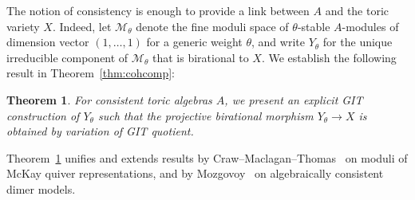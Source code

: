 \documentclass[11pt,a4paper]{amsart}
\numberwithin{equation}{section}
\newtheorem{theorem}{Theorem}[section]
\theoremstyle{definition}
\theoremstyle{remark}
\begin{document}
The notion of consistency is enough to provide a link between $A$ and the toric variety $X$. Indeed, let $\mathcal{M}_{\theta}$ denote the fine moduli space of $\theta$-stable $A$-modules of dimension vector $(1,\dots,1)$ for a generic weight $\theta$, and write $Y_\theta$ for the unique irreducible component of $\mathcal{M}_\theta$ that is birational to $X$.  We establish the following result in Theorem~\ref{thm:cohcomp}:

\begin{theorem}
\label{thm:1.1}
For consistent toric algebras $A$, we present an explicit GIT construction of $Y_\theta$ such that the projective birational morphism $Y_\theta\to X$ is obtained by variation of GIT quotient.
\end{theorem}

\noindent  Theorem~\ref{thm:1.1} unifies and extends results by Craw--Maclagan--Thomas~\cite{CMT1} on moduli of McKay quiver representations, and by Mozgovoy~\cite{Mozgovoy} on algebraically consistent dimer models. 

\medskip
\end{document}
